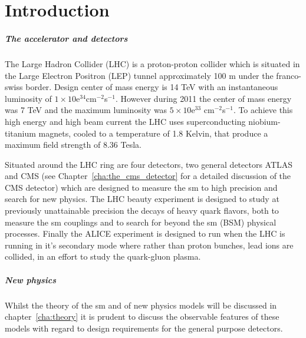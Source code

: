 \chapter{Introduction} %
\label{cha:introduction}
\paragraph{The accelerator and detectors} %
\label{par:the_accelerator_and_detectors}
The Large Hadron Collider (LHC) \cite{Benedikt:823808} is a proton-proton collider which is situated in the Large Electron Positron
(LEP) tunnel approximately 100 m under the franco-swiss border. Design center of mass energy is 14 TeV with an instantaneous
luminosity of $ 1 \times 10$e$^{34}$cm$^{-2}$s$^{-1}$. However during 2011 the center of mass energy was 7 TeV and the maximum
luminosity was $ 5 \times 10$e$^{33}$ cm$^{-2}$s$^{-1}$.
To achieve this high energy and high beam current the LHC uses superconducting niobium-titanium magnets, cooled to a temperature of 
1.8 Kelvin, that produce a maximum field strength of 8.36 Tesla.


Situated around the LHC ring are four detectors, two general detectors ATLAS \cite{Akesson:1999uv} and CMS (see
Chapter~\ref{cha:the_cms_detector} for a detailed discussion of the CMS detector) \cite{Friedl:1140134}\cite{Wulz:vf} which are  designed to measure the \ac{sm} to high precision and search for new physics. The LHC beauty experiment 
\cite{Rademacker:2005tx} is designed to study at previously unattainable precision the decays of heavy quark 
flavors, both to measure the \ac{sm} couplings and to search for beyond the \ac{sm} (BSM) physical processes. Finally
the ALICE \cite{Alessandro:2006ht} experiment is designed to run when the LHC is running in it's secondary mode where rather than
proton bunches, lead ions are collided, in an effort to study the quark-gluon plasma.




\paragraph{New physics} %
\label{par:new_physics}
Whilst the theory of the \ac{sm} and of new physics models will be discussed in chapter~\ref{cha:theory} it is prudent to 
discuss the observable features of these models with regard to design requirements for the general purpose detectors.
